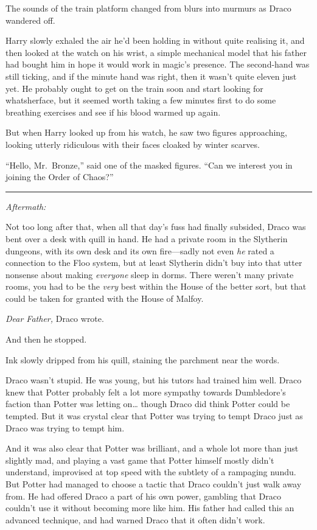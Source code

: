 The sounds of the train platform changed from blurs into murmurs as
Draco wandered off.

Harry slowly exhaled the air he'd been holding in without quite
realising it, and then looked at the watch on his wrist, a simple
mechanical model that his father had bought him in hope it would work in
magic's presence. The second-hand was still ticking, and if the minute
hand was right, then it wasn't quite eleven just yet. He probably ought
to get on the train soon and start looking for whatsherface, but it
seemed worth taking a few minutes first to do some breathing exercises
and see if his blood warmed up again.

But when Harry looked up from his watch, he saw two figures approaching,
looking utterly ridiculous with their faces cloaked by winter scarves.

``Hello, Mr.~Bronze,'' said one of the masked figures. ``Can we interest
you in joining the Order of Chaos?''

\begin{center}\rule{3in}{0.4pt}\end{center}

\emph{Aftermath:}

Not too long after that, when all that day's fuss had finally subsided,
Draco was bent over a desk with quill in hand. He had a private room in
the Slytherin dungeons, with its own desk and its own fire---sadly not
even \emph{he} rated a connection to the Floo system, but at least
Slytherin didn't buy into that utter nonsense about making
\emph{everyone} sleep in dorms. There weren't many private rooms, you
had to be the \emph{very} best within the House of the better sort, but
that could be taken for granted with the House of Malfoy.

\emph{Dear Father,} Draco wrote.

And then he stopped.

Ink slowly dripped from his quill, staining the parchment near the
words.

Draco wasn't stupid. He was young, but his tutors had trained him well.
Draco knew that Potter probably felt a lot more sympathy towards
Dumbledore's faction than Potter was letting on\ldots{} though Draco did
think Potter could be tempted. But it was crystal clear that Potter was
trying to tempt Draco just as Draco was trying to tempt him.

And it was also clear that Potter was brilliant, and a whole lot more
than just slightly mad, and playing a vast game that Potter himself
mostly didn't understand, improvised at top speed with the subtlety of a
rampaging nundu. But Potter had managed to choose a tactic that Draco
couldn't just walk away from. He had offered Draco a part of his own
power, gambling that Draco couldn't use it without becoming more like
him. His father had called this an advanced technique, and had warned
Draco that it often didn't work.

